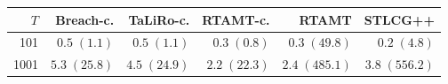 \setlength{\tabcolsep}{5pt}%
\begin{tabular}{r r r r r r}
\hline
$T$ & Breach-c. & TaLiRo-c. & RTAMT-c. & RTAMT & STLCG++ \\
\hline
  101 & $0.5\;(1.1)$ & $0.5\;(1.1)$ & $0.3\;(0.8)$ & $0.3\;(49.8)$ & $0.2\;(4.8)$ \\
 1001 & $5.3\;(25.8)$ & $4.5\;(24.9)$ & $2.2\;(22.3)$ & $2.4\;(485.1)$ & $3.8\;(556.2)$ \\
\hline
\end{tabular}%
